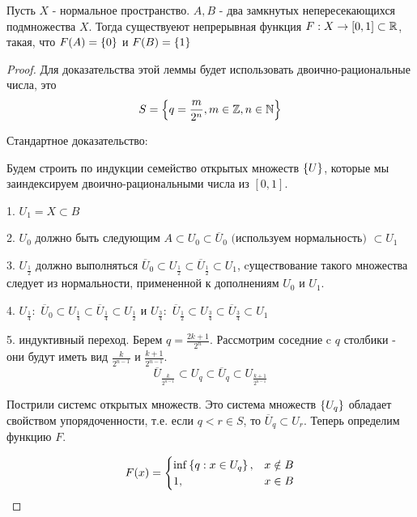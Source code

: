 \begin{theorem}
    Пусть $X$ - нормальное пространство. $A, B$ - два замкнутых непересекающихся подмножества $X$. Тогда существуеют непрерывная функция $F: X \rightarrow [0, 1] \subset \mathbb{R}$, такая, что $F(A) = \left\{0\right\}$ и $F(B) = \left\{1\right\}$
\end{theorem}
\begin{proof}
    Для доказательства этой леммы будет использовать двоично-рациональные числа, это
    \[
        S = \left\{q = \frac{m}{2^n}, m \in \mathbb{Z}, n \in \mathbb{N}\right\}
    \]

    Стандартное доказательство: 
        
        Будем строить по индукции семейство открытых множеств $\left\{U\right\}$, которые мы заиндексируем двоично-рациональными числа из $[0, 1]$.
        
            1. $U_1 = X \subset B$
            
            2. $U_0$ должно быть следующим $A \subset U_0 \subset \overline{U}_0 \textbf{ (используем нормальность) } \subset U_1$

            3. $U_{\frac{1}{2}}$ должно выполняться $\overline{U}_0 \subset U_{\frac{1}{2}} \subset \overline{U}_{\frac{1}{2}} \subset U_1$, cуществование такого множества следует из нормальности, примененной к дополнениям $U_0$ и $U_1$.

            4. $U_{\frac{1}{4}}:$ $\overline{U}_0 \subset U_{\frac{1}{4}} \subset \overline{U}_{\frac{1}{4}} \subset U_{\frac{1}{2}}$ и $U_{\frac{3}{4}}:$ $\overline{U}_\frac{1}{2} \subset U_{\frac{3}{4}} \subset \overline{U}_{\frac{3}{4}} \subset U_{1}$

            5. индуктивный переход. Берем $q = \frac{2k + 1}{2^n}$. Рассмотрим соседние c $q$ столбики - они будут иметь вид $\frac{k}{2^{n - 1}}$ и $\frac{k + 1}{2^{n - 1}}$.
            \[
                \overline{U}_{\frac{k}{2^{n - 1}}} \subset U_q \subset \overline{U}_q \subset U_{\frac{k + 1}{2^{n - 1}}}
            \]

        Пострили системс открытых множеств. Это система множеств $\left\{U_q\right\}$ обладает свойством упорядоченности, т.е. если $q < r \in S$, то $\overline{U}_q \subset U_r$. Теперь определим функцию $F$.


        \[
            F(x) = 
                \begin{cases}
                    \inf\left\{q : x \in U_q\right\}, & x \notin B \\
                    1, & x \in B
                \end{cases}
        \]


\end{proof}
